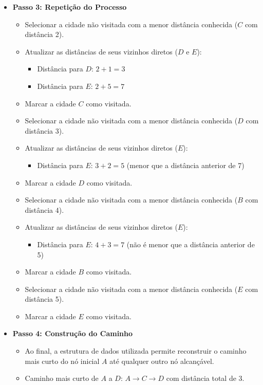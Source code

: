 \documentclass[manuscript,screen,review]{acmart}
\begin{document}
\begin{itemize}
    \item \textbf{Passo 3: Repetição do Processo}
    \begin{itemize}
        \item Selecionar a cidade não visitada com a menor distância conhecida ($C$ com distância 2).
        \item Atualizar as distâncias de seus vizinhos diretos ($D$ e $E$):
        \begin{itemize}
            \item Distância para $D$: $2 + 1 = 3$
            \item Distância para $E$: $2 + 5 = 7$
        \end{itemize}
        \item Marcar a cidade $C$ como visitada.
        \item Selecionar a cidade não visitada com a menor distância conhecida ($D$ com distância 3).
        \item Atualizar as distâncias de seus vizinhos diretos ($E$):
        \begin{itemize}
            \item Distância para $E$: $3 + 2 = 5$ (menor que a distância anterior de 7)
        \end{itemize}
        \item Marcar a cidade $D$ como visitada.
        \item Selecionar a cidade não visitada com a menor distância conhecida ($B$ com distância 4).
        \item Atualizar as distâncias de seus vizinhos diretos ($E$):
        \begin{itemize}
            \item Distância para $E$: $4 + 3 = 7$ (não é menor que a distância anterior de 5)
        \end{itemize}
        \item Marcar a cidade $B$ como visitada.
        \item Selecionar a cidade não visitada com a menor distância conhecida ($E$ com distância 5).
        \item Marcar a cidade $E$ como visitada.
    \end{itemize}

    \item \textbf{Passo 4: Construção do Caminho}
    \begin{itemize}
        \item Ao final, a estrutura de dados utilizada permite reconstruir o caminho mais curto do nó inicial $A$ até qualquer outro nó alcançável.
        \item Caminho mais curto de $A$ a $D$: $A \rightarrow C \rightarrow D$ com distância total de 3.
    \end{itemize}
\end{itemize}
\end{document}
